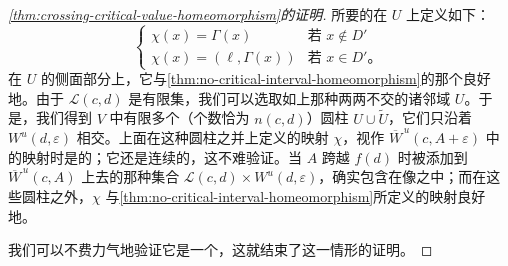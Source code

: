 \begin{proof}[\cref{thm:crossing-critical-value-homeomorphism}的证明]
所要的\trHomeomorphism{}在 $U$ 上定义如下：
\[
\begin{cases}
\chi(x)=\varGamma(x) & \text{若 } x\notin D'\\
\chi(x)=(\ell,\varGamma(x)) & \text{若 } x\in D'\text{。}
\end{cases}
\]
在 $U$ 的侧面部分上，它与\cref{thm:no-critical-interval-homeomorphism}的那个\trHomeomorphism{}良好地\trGluing。由于 $\mathcal{L}(c,d)$ 是有限集，我们可以选取如上那种两两不交的诸邻域 $U$。于是，我们得到 $V$ 中有限多个（个数恰为 $n(c,d)$）圆柱 $U\cup\widetilde{U}$，它们只沿着 $W^u(d,\varepsilon)$ 相交。上面在这种圆柱之并上定义的映射 $\chi$，视作 $\overline{W}^{\,u}(c,A+\varepsilon)$ 中的映射时是\trInjective{}的；它还是连续的，这不难验证。当 $A$ 跨越\trCriticalValue{} $f(d)$ 时被添加到 $\overline{W}^{\,u}(c,A)$ 上去的那种集合 $\mathcal{L}(c,d)\times W^u(d,\varepsilon)$，确实包含在像之中；而在这些圆柱之外，$\chi$ 与\cref{thm:no-critical-interval-homeomorphism}所定义的映射良好地\trGluing。

我们可以不费力气地验证它是一个\trHomeomorphism，这就结束了这一情形的证明。


\end{proof}
